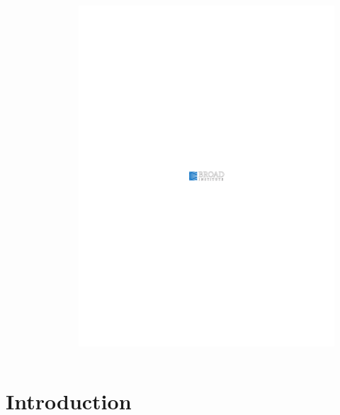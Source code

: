 \documentclass[pdf, usepdftitle=false]{beamer}
\begin{document}
\begin{frame}[plain]
\begin{columns}
\begin{column}{0.33\textwidth}
\begin{figure}[b]
\end{figure}
\end{column}
\begin{column}{0.33\textwidth}
\begin{figure}[b]
\includegraphics[width=\textwidth]{broad}
\end{figure}
\end{column}
\end{columns}
\end{frame}

\section{Introduction}
\subsection{}
\end{document}
